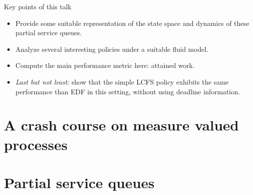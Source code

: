 \documentclass[aspectratio=169]{beamer}
\newenvironment*{myitem}[1][1.5em]{\begin{itemize}\setlength{\itemsep}{#1}}{\end{itemize}}
\begin{document}
\begin{frame}{Key points of this talk}
	
	\begin{myitem}
		\item Provide some suitable representation of the state space and dynamics of these partial service queues.
		
		\item Analyze several interesting policies under a suitable fluid model.
		
		\item Compute the main performance metric here: \alert{attained work}.
		
		\item \emph{Last but not least:} show that the simple LCFS policy \alert{exhibits the same performance} than EDF in this setting, without using deadline information. 
	\end{myitem}
\end{frame}

\section{A crash course on measure valued processes}

\section{Partial service queues}
\end{document}

